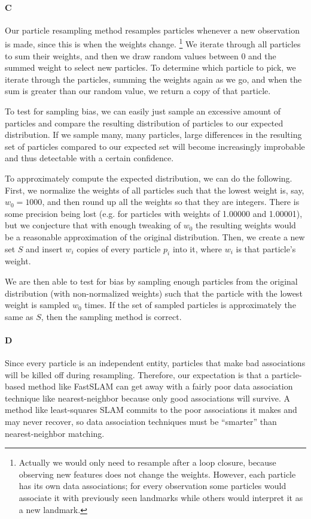 \documentclass[12pt]{article}
\begin{document}
\paragraph{C} %
Our particle resampling method resamples particles whenever a new observation
is made, since this is when the weights change. \footnote{Actually we would only need to resample
after a loop closure, because observing new features does not change the weights. However,
each particle has its own data associations; for every observation some particles would
associate it with previously seen landmarks while others would interpret it as a new landmark.}
We iterate through all particles to sum their weights, and then we draw random values between 0 and
the summed weight to select new particles. To determine which particle to pick,
we iterate through the particles, summing the weights again as we go, and when
the sum is greater than our random value, we return a copy of that particle.

To test for sampling bias, we can easily just sample an excessive amount of
particles and compare the resulting distribution of particles to our
expected distribution. If we sample many, many particles, large differences
in the resulting set of particles compared to our expected set will become
increasingly improbable and thus detectable with a certain confidence.

To approximately compute the expected distribution, we can do the following. First, we normalize the weights
of all particles such that the lowest weight is, say, $w_0=1000$, and then round up all the weights so
that they are integers. There is some precision being lost (e.g. for particles with weights of 1.00000 and
1.00001), but we conjecture that with enough tweaking of $w_0$
the resulting weights would be
a reasonable approximation of the original distribution. Then, we create a new set $S$ and insert $w_i$
copies of every particle $p_i$ into it, where $w_i$ is that particle's weight.

We are then able to test for bias by sampling enough particles from the original distribution
(with non-normalized weights) such that the particle with the lowest weight is sampled $w_0$ times.
If the set of sampled particles is approximately the same as $S$, then the sampling method is correct.

\paragraph{D}
Since every particle is an independent entity, particles that make bad
associations will be killed off during resampling. Therefore, our
expectation is that a particle-based method like FastSLAM can get away
with a fairly poor data association technique like nearest-neighbor
because only good associations will survive. A method like least-squares
SLAM commits to the poor associations it makes and may never recover, so
data association techniques must be ``smarter'' than nearest-neighbor
matching.
\end{document}
